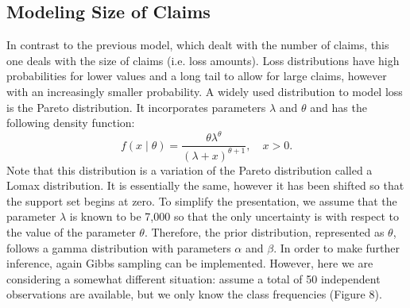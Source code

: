\documentclass[11pt, oneside]{article}
\begin{document}
\subsection{Modeling Size of Claims}

In contrast to the previous model, which dealt with the number of claims, this one deals with the size of claims (i.e. loss amounts). Loss distributions have high probabilities for lower values and a long tail to allow for large claims, however with an increasingly smaller probability. A widely used distribution to model loss is the Pareto distribution. It incorporates parameters $\lambda$ and $\theta$ and has the following density function:
\[
f(x\mid\theta)=\frac{\theta\lambda^\theta}{(\lambda+x)^{\theta+1}},\quad\mbox{$x>0$}.
\]
Note that this distribution is a variation of the Pareto distribution called a Lomax distribution. It is essentially the same, however it has been shifted so that the support set begins at zero. To simplify the presentation, we assume that the parameter $\lambda$ is known to be 7,000 so that the only uncertainty is with respect to the value of the parameter $\theta$. Therefore, the prior distribution, represented as $\theta$, follows a gamma distribution with parameters $\alpha$ and $\beta$. In order to make further inference, again Gibbs sampling can be implemented. However, here we are considering a somewhat different situation: assume a total of 50 independent observations are available, but we only know the class frequencies (Figure 8).
\end{document}
